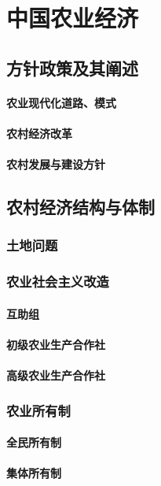 \documentclass[UTF8]{../../RepresentationUniverse}
\begin{document}
\chapter{中国农业经济}
\section{方针政策及其阐述}
    \subsubsection{农业现代化道路、模式}
    \subsubsection{农村经济改革}
    \subsubsection{农村发展与建设方针}
\section{农村经济结构与体制}
    \subsection{土地问题}
    \subsection{农业社会主义改造}
        \subsubsection{互助组}
        \subsubsection{初级农业生产合作社}
        \subsubsection{高级农业生产合作社}
    \subsection{农业所有制}
        \subsubsection{全民所有制}
        \subsubsection{集体所有制}
\end{document}
